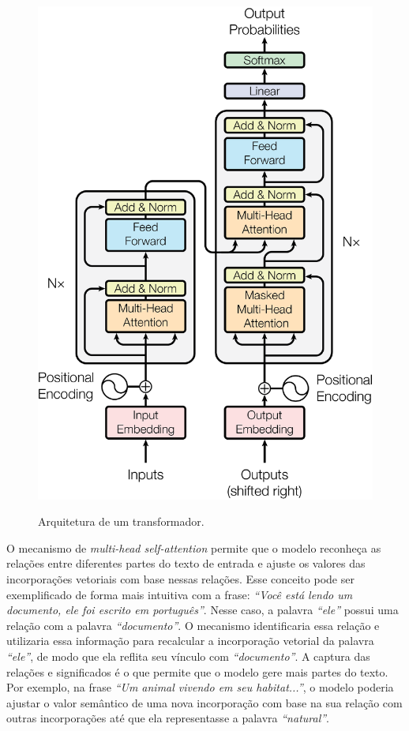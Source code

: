 \begin{figure}[ht]
    \centering
    \caption{\small Arquitetura de um transformador.}
    \includegraphics[width=0.4\columnwidth,keepaspectratio]{images/transformer.png}
    \label{fig:transformer}
\end{figure}

O mecanismo de \textit{multi-head self-attention} permite que o modelo reconheça as relações entre diferentes partes do
texto de entrada e ajuste os valores das incorporações vetoriais com base nessas relações. Esse conceito pode ser
exemplificado de forma mais intuitiva com a frase: \textit{``Você está lendo um documento, ele foi escrito em
português''}. Nesse caso, a palavra \textit{``ele''} possui uma relação com a palavra \textit{``documento''}. O
mecanismo identificaria essa relação e utilizaria essa informação para recalcular a incorporação vetorial da palavra
\textit{``ele''}, de modo que ela reflita seu vínculo com \textit{``documento''}. A captura das relações e significados
é o que permite que o modelo gere mais partes do texto. Por exemplo, na frase \textit{``Um animal vivendo em seu
habitat...''}, o modelo poderia ajustar o valor semântico de uma nova incorporação com base na sua relação com outras
incorporações até que ela representasse a palavra \textit{``natural''}.

